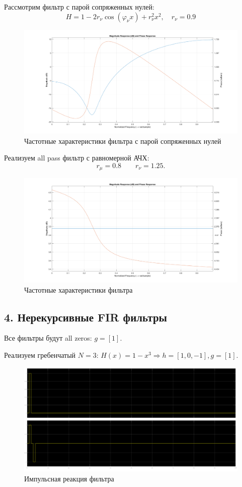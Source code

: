 \documentclass[12pt,a4paper]{article}
\begin{document}
	Рассмотрим фильтр с парой сопряженных нулей:
	$$ H = 1 -2 r_\nu \cos( \varphi_\nu x) + r_\nu^2 x^2, \quad r_\nu = 0.9$$
	\begin{figure}[H]
		\centering
		\includegraphics[width=1.0\linewidth]{res/3_3_09.png}
		\caption{Частотные характеристики фильтра с парой сопряженных нулей}
	\end{figure}
	
	Реализуем all pass фильтр с равномерной АЧХ:
	$$ r_\mu = 0.8 \qquad r_\nu = 1.25.$$
	\begin{figure}[H]
		\centering
		\includegraphics[width=1.0\linewidth]{res/3_4_allpass.png}
		\caption{Частотные характеристики фильтра}
	\end{figure}
	
	\subsection*{4. Нерекурсивные FIR фильтры}
	
	Все фильтры будут all zeros: $g = [1]$.
	
	Реализуем гребенчатый $N = 3$: $H(x) = 1 - x^3 \Rightarrow h = [1, 0, -1], g = [1]$.
	\begin{figure}[H]
		\centering
		\includegraphics[width=1.0\linewidth]{res/4_1_time.png}
		\caption{Импульсная реакция фильтра}
	\end{figure}
		
\end{document}
